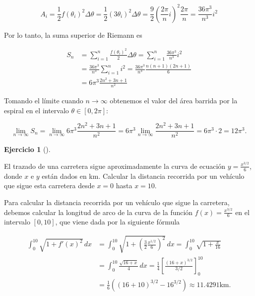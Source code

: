 \documentclass[
  a4paper,
]{scrreport}
\theoremstyle{definition}
\newtheorem{exercise}{Ejercicio}[chapter]
\theoremstyle{remark}
\begin{document}
\begin{tcolorbox}
\[
A_i 
= \frac{1}{2}f(\theta_i)^2\Delta \theta
= \frac{1}{2}(3\theta_i)^2\Delta \theta
= \frac{9}{2} \left(\frac{2\pi}{n}i\right)^2 \frac{2\pi}{n}
= \frac{36\pi^3}{n^3}i^2
\]

Por lo tanto, la suma superior de Riemann es

\begin{align*}
S_n 
&= \sum_{i=1}^n \frac{f(\theta_i)^2}{2}\Delta \theta 
= \sum_{i=1}^n \frac{36\pi^3}{n^3}i^2 \\
&= \frac{36\pi^3}{n^3} \sum_{i=1}^n i^2
=  \frac{36\pi^3}{n^3} \frac{n(n+1)(2n+1)}{6} \\
&= 6\pi^3  \frac{2n^2+3n+1}{n^2} 
\end{align*}

Tomando el límite cuando \(n \to \infty\) obtenemos el valor del área
barrida por la espiral en el intervalo \(\theta \in [0, 2\pi]\):

\[
\lim_{n \to \infty} S_n
= \lim_{n \to \infty} 6\pi^3  \frac{2n^2+3n+1}{n^2}
= 6\pi^3 \lim_{n \to \infty} \frac{2n^2+3n+1}{n^2}
= 6\pi^3\cdot 2
= 12\pi^3.
\]

\end{tcolorbox}

\begin{exercise}[]\protect\hypertarget{exr-2}{}\label{exr-2}

El trazado de una carretera sigue aproximadamente la curva de ecuación
\(y=\frac{x^{3/2}}{6}\), donde \(x\) e \(y\) están dados en km. Calcular
la distancia recorrida por un vehículo que sigue esta carretera desde
\(x=0\) hasta \(x=10\).

\end{exercise}

\begin{tcolorbox}[enhanced jigsaw, opacityback=0, bottomtitle=1mm, coltitle=black, opacitybacktitle=0.6, colback=white, breakable, left=2mm, titlerule=0mm, bottomrule=.15mm, colbacktitle=quarto-callout-tip-color!10!white, toprule=.15mm, leftrule=.75mm, arc=.35mm, toptitle=1mm, colframe=quarto-callout-tip-color-frame, title=\textcolor{quarto-callout-tip-color}{\faLightbulb}\hspace{0.5em}{Solución}, rightrule=.15mm]

Para calcular la distancia recorrida por un vehículo que sigue la
carretera, debemos calcular la longitud de arco de la curva de la
función \(f(x)=\frac{x^{3/2}}{6}\) en el intervalo \([0,10]\), que viene
dada por la siguiente fórmula

\begin{align*}
\int_0^{10}  \sqrt{1+f'(x)^2}\,dx 
&= \int_0^{10} \sqrt{1+\left(\frac{3}{2}\frac{x^{1/2}}{6}\right)^2}\,dx
= \int_0^{10} \sqrt{1+\frac{x}{16}} \\
&= \int_0^{10} \frac{\sqrt{16+x}}{4}\,dx
= \frac{1}{4}\left[\frac{(16+x)^{3/2}}{3/2}\right]_0^{10} \\
&= \frac{1}{6}\left((16+10)^{3/2}-16^{3/2}\right)
\approx 11.4291 \mbox{km}.
\end{align*}

\end{tcolorbox}
\end{document}
